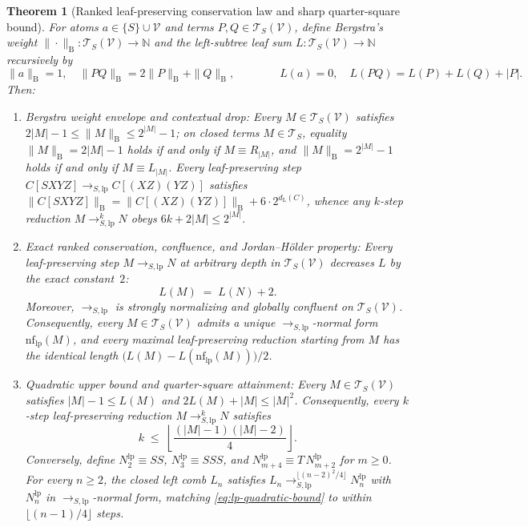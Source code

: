 \documentclass[11pt,reqno]{amsart}
\numberwithin{equation}{section}
\theoremstyle{plain}
\newtheorem{theorem}{Theorem}[section]
\theoremstyle{definition}
\theoremstyle{remark}
\newcommand{\TS}{\mathcal{T}_S}
\newcommand{\TSV}{\mathcal{T}_S(\mathcal{V})}
\begin{document}
\begin{theorem}[Ranked leaf-preserving conservation law and sharp quarter-square bound]\label{thm:leaf-preserving}
For atoms $a \in \{S\} \cup \mathcal{V}$ and terms $P, Q \in \TSV$, define Bergstra's weight $\|\cdot\|_{\mathrm{B}} \colon \TSV \to \mathbb{N}$ and the \emph{left-subtree leaf sum} $L \colon \TSV \to \mathbb{N}$ recursively by
\[
  \|a\|_{\mathrm{B}} = 1, \quad \|P Q\|_{\mathrm{B}} = 2\|P\|_{\mathrm{B}} + \|Q\|_{\mathrm{B}}, \qquad\qquad
  L(a) = 0, \quad L(P Q) = L(P) + L(Q) + |P|.
\]
Then:
\begin{enumerate}[label=(\roman*),leftmargin=2.2em]
  \item \emph{Bergstra weight envelope and contextual drop:} Every $M \in \TSV$ satisfies $2|M| - 1 \le \|M\|_{\mathrm{B}} \le 2^{|M|} - 1$; on closed terms $M \in \TS$, equality $\|M\|_{\mathrm{B}} = 2|M| - 1$ holds if and only if $M \equiv R_{|M|}$, and $\|M\|_{\mathrm{B}} = 2^{|M|} - 1$ holds if and only if $M \equiv L_{|M|}$. Every leaf-preserving step $C[S X Y Z] \to_{S,\mathrm{lp}} C[(X Z)(Y Z)]$ satisfies $\|C[S X Y Z]\|_{\mathrm{B}} = \|C[(X Z)(Y Z)]\|_{\mathrm{B}} + 6 \cdot 2^{d_{\mathrm{L}}(C)}$, whence any $k$-step reduction $M \to_{S,\mathrm{lp}}^k N$ obeys $6k + 2|M| \le 2^{|M|}$.
  \item \emph{Exact ranked conservation, confluence, and Jordan--H\"older property:} Every leaf-preserving step $M \to_{S,\mathrm{lp}} N$ at arbitrary depth in $\TSV$ decreases $L$ by the exact constant~$2$:
  \begin{equation}\label{eq:left-subtree-drop}
    L(M) \;=\; L(N) + 2.
  \end{equation}
  Moreover, $\to_{S,\mathrm{lp}}$ is strongly normalizing and globally confluent on $\TSV$. Consequently, every $M \in \TSV$ admits a unique $\to_{S,\mathrm{lp}}$-normal form $\mathrm{nf}_{\mathrm{lp}}(M)$, and every maximal leaf-preserving reduction starting from $M$ has the identical length $\bigl(L(M) - L(\mathrm{nf}_{\mathrm{lp}}(M))\bigr)/2$.
  \item \emph{Quadratic upper bound and quarter-square attainment:} Every $M \in \TSV$ satisfies $|M| - 1 \le L(M)$ and $2 L(M) + |M| \le |M|^2$. Consequently, every $k$-step leaf-preserving reduction $M \to_{S,\mathrm{lp}}^k N$ satisfies
  \begin{equation}\label{eq:lp-quadratic-bound}
    k \;\le\; \left\lfloor \frac{(|M|-1)(|M|-2)}{4} \right\rfloor.
  \end{equation}
  Conversely, define $N_2^{\mathrm{lp}} \equiv S S$, $N_3^{\mathrm{lp}} \equiv S S S$, and $N_{m+4}^{\mathrm{lp}} \equiv T\,N_{m+2}^{\mathrm{lp}}$ for $m \ge 0$. For every $n \ge 2$, the closed left comb $L_n$ satisfies $L_n \to_{S,\mathrm{lp}}^{\lfloor(n-2)^2/4\rfloor} N_n^{\mathrm{lp}}$ with $N_n^{\mathrm{lp}}$ in $\to_{S,\mathrm{lp}}$-normal form, matching \eqref{eq:lp-quadratic-bound} to within $\lfloor(n-1)/4\rfloor$ steps.
\end{enumerate}
\end{theorem}
\end{document}
